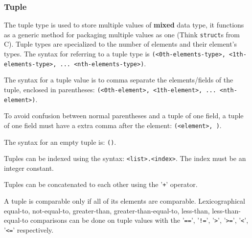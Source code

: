 
\subsubsection{Tuple}
{
	The tuple type is used to store
	multiple values of \textbf{mixed} data type,
	it functions as a generic method for packaging multiple values
	as one (Think \texttt{struct}s from C).
	Tuple types are specialized to the number of elements and their element's
	types. The syntax for referring to a tuple type
	is \texttt{(<0th-elements-type>, <1th-elements-type>, ... <nth-elements-type>)}.
	
	The syntax for a tuple value is to comma separate the elements/fields
	of the tuple, enclosed in
	parentheses: \texttt{(<0th-element>, <1th-element>, ... <nth-element>)}.
	
	To avoid confusion between normal parentheses
	and a tuple of one field, a tuple of one field must have a extra comma after
	the element: \texttt{(<element>, )}.
	
	The syntax for an empty tuple is: \texttt{()}.
	
	Tuples can be indexed using the
	syntax: \texttt{<list>.<index>}. The
	index must be an integer constant.
	
	Tuples can be concatenated to each other using the '\texttt{+}' operator.
	
	A tuple is comparable only if all of its elements are comparable.
	Lexicographical equal-to, not-equal-to, greater-than, greater-than-equal-to,
	less-than, less-than-equal-to comparisons can be done on tuple values with
	the '\texttt{==}', '\texttt{!=}',
	'\texttt{>}', '\texttt{>=}', '\texttt{<}', '\texttt{<=}' respectively.
}
